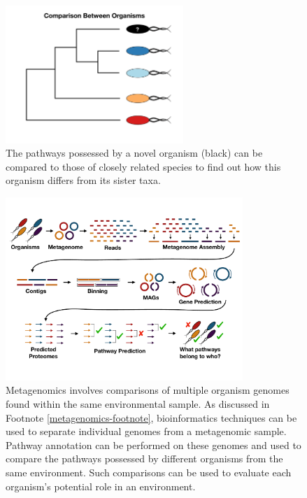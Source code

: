\begin{figure}[!ht]
  \centering
	\includegraphics[width=0.6\textwidth]{media/compare-phylogenetically.pdf}
	 \caption{The pathways possessed by a novel organism (black) can be compared to those of closely related species to find out how this organism differs from its sister taxa.}
	 \label{fig:phylogenetic-comparison}
\end{figure}

\begin{figure}[!ht]
  \centering
	\includegraphics[width=0.8\textwidth]{media/metagenomics.pdf}
	 \caption{Metagenomics involves comparisons of multiple organism genomes found within the same environmental sample. As discussed in Footnote \ref{metagenomics-footnote}, bioinformatics techniques can be used to separate individual genomes from a metagenomic sample. Pathway annotation can be performed on these genomes and used to compare the pathways possessed by different organisms from the same environment. Such comparisons can be used to evaluate each organism's potential role in an environment.}
	 \label{fig:metagenomics}
\end{figure}

